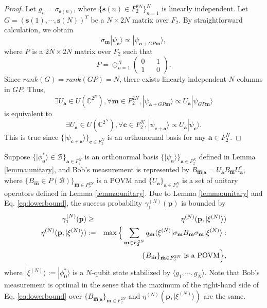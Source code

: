 \documentclass[aps,prx,twocolumn,showpacs,amsmath,notitlepage,amssymb,superscriptaddress]{revtex4-1}
\newcommand{\bra}[1]{\langle {#1} |}
\newcommand{\ket}[1]{| {#1} \rangle}
\begin{document}
\begin{proof}
Let $g_n=\sigma_{\mathbf{s}(n)}$, where $\{\mathbf{s}(n)\in F_2^{2N}\}_{n=1}^N$ is linearly independent. Let $G=(\mathbf{s}(1),\cdots,\mathbf{s}(N))^T$ be a $N\times 2N$ matrix over $F_2$. By straightforward calculation, we obtain
 \begin{equation}
 \sigma_{\mathbf{m}}\ket{\psi_{\mathbf{a}}}\propto \ket{\psi_{\mathbf{a}+GP\mathbf{m}}},
\end{equation}
where $P$ is a $2N\times 2N$ matrix over $F_2$ such that
\begin{equation}
 P=\oplus_{n=1}^N
 \begin{pmatrix}
 0&&1\\
 1&&0
\end{pmatrix}.
\end{equation}
Since $rank(G)=rank(GP)=N$, there exists linearly independent $N$ columns in $GP$. Thus,
\begin{equation}
 \exists U_{\mathbf{a}}\in U(\mathbb{C}^{2^N}),\forall\mathbf{m}\in F_2^{2N},\ket{\psi_{\mathbf{a}+GP\mathbf{m}}}\propto U_{\mathbf{a}}\ket{\psi_{GP\mathbf{m}}}
\end{equation}
is equivalent to
\begin{equation}
 \exists U_{\mathbf{a}}\in U(\mathbb{C}^{2^N}),\forall\mathbf{c}\in F_2^{N},\ket{\psi_{\mathbf{c}+\mathbf{a}}}\propto U_{\mathbf{a}}\ket{\psi_{\mathbf{c}}}.
\end{equation}
This is true since $\{\ket{\psi_{\mathbf{c}+\mathbf{a}}}\}_{\mathbf{c}\in F_2^N}$ is an orthonormal basis for any $\mathbf{a}\in F_2^N$.
\end{proof}

Suppose $\{\ket{\phi^*_{\mathbf{a}}}\in\mathcal{B}\}_{\mathbf{a}\in F_2^N}$ is an orthonormal basis $\{\ket{\psi_{\mathbf{a}}}\}_{\mathbf{a}\in F_2^N}$ defined in Lemma \ref{lemma:unitary}, and Bob's measurement is represented by $B_{\hat{\mathbf{m}}|\mathbf{a}}=U_{\mathbf{a}}B_{\hat{\mathbf{m}}}U_{\mathbf{a}}^{\dag}$, where $\{B_{\hat{\mathbf{m}}}\in P(\mathcal{B})\}_{\hat{\mathbf{m}}\in F_2^{2N}}$ is a POVM and $\{U_{\mathbf{a}}\}_{\mathbf{a}\in F_2^N}$ is a set of unitary operators defined in Lemma \ref{lemma:unitary}. Due to Lemma \ref{lemma:unitary} and Eq. \eqref{eq:lowerbound}, the success probability $\gamma_1^{(N)}(\mathbf{p})$ is bounded by
\begin{eqnarray}
\label{eq:lowerbound2}
\gamma_1^{(N)}(\mathbf{p})&\geq& \eta^{(N)}(\mathbf{p},\ket{\xi^{(N)}})\\
\eta^{(N)}(\mathbf{p},\ket{\xi^{(N)}})&:=& \max\Big\{\sum_{\mathbf{m}\in F_2^{2N}}q_{\mathbf{m}}\bra{\xi^{(N)}}\sigma_{\mathbf{m}}B_{\mathbf{m}}\sigma_{\mathbf{m}}\ket{\xi^{(N)}}:\nonumber\\
&&\{B_{\hat{\mathbf{m}}}\}_{\hat{\mathbf{m}}\in F_2^{2N}}{\rm\ is\ a\ POVM}\Big\},
\end{eqnarray}
where $\ket{\xi^{(N)}}:=\ket{\phi^*_{\mathbf{0}}}$ is a $N$-qubit state stabilized by $\langle g_1,\cdots, g_N\rangle$. Note that Bob's measurement is optimal in the sense that the maximum of the right-hand side of Eq. \eqref{eq:lowerbound} over $\{B_{\hat{\mathbf{m}}|\mathbf{a}}\}_{\hat{\mathbf{m}}\in F_2^{2N}}$ and $\eta^{(N)}(\mathbf{p},\ket{\xi^{(N)}})$ are the same.
\end{document}
